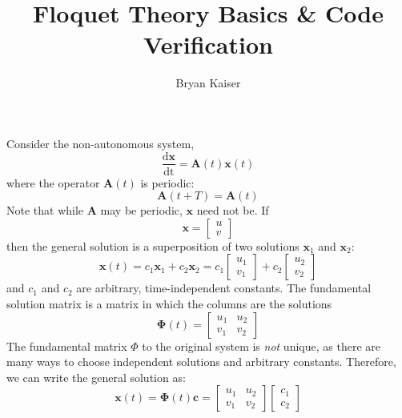 \documentclass{article}
\title{Floquet Theory Basics \& Code Verification}
\author{Bryan Kaiser}
\begin{document}
\maketitle

Consider the non-autonomous system, 
\begin{equation}
 \frac{\mathrm{d}\mathbf{x}}{\mathrm{dt}}=\mathbf{A}(t)\mathbf{x}(t)
\end{equation}
where the operator $\mathbf{A}(t)$ is periodic:
\begin{equation}
 \mathbf{A}(t+T)=\mathbf{A}(t)
\end{equation}
Note that while $\mathbf{A}$ may be periodic, $\mathbf{x}$ need not be.
If
\begin{equation}
 \mathbf{x}=\begin{bmatrix*}
  u \\
  v
 \end{bmatrix*}
\end{equation}
then the general solution is a superposition of two solutions $\mathbf{x}_1$ and $\mathbf{x}_2$:
\begin{equation}
 \mathbf{x}(t)=c_1\mathbf{x}_1+c_2\mathbf{x}_2
 =c_1\begin{bmatrix*}
  u_1 \\
  v_1
 \end{bmatrix*}+c_2\begin{bmatrix*}
  u_2 \\
  v_2
 \end{bmatrix*}
\end{equation}
and $c_1$ and $c_2$ are arbitrary, time-independent constants.
The fundamental solution matrix is a matrix in which the columns are the solutions
\begin{equation}
 \boldsymbol{\Phi}(t)=\begin{bmatrix*}
 u_1 & u_2 \\
 v_1 & v_2
 \end{bmatrix*}
\end{equation}
The fundamental matrix $\Phi$ to the original system is \textit{not} unique, as there are many ways to 
choose independent solutions and arbitrary constants. 
Therefore, we can write the general solution as:
\begin{equation}
 \mathbf{x}(t)=\boldsymbol{\Phi}(t)\mathbf{c}=\begin{bmatrix*}
 u_1 & u_2 \\
 v_1 & v_2
 \end{bmatrix*}
  \begin{bmatrix*}
  c_1 \\
  c_2
 \end{bmatrix*}
 \label{eq:gen_soln}
\end{equation}
\end{document}
